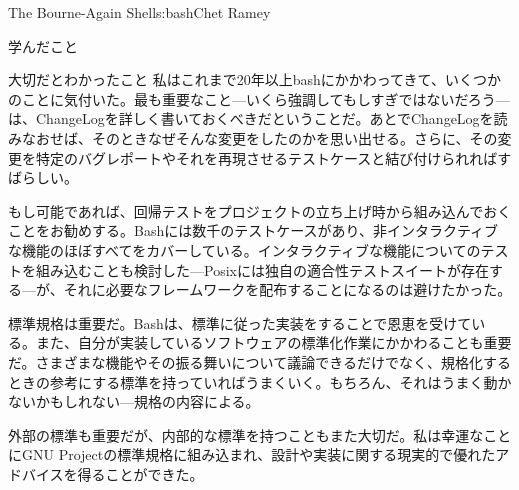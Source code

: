 \begin{aosachapter}{The Bourne-Again Shell}{s:bash}{Chet Ramey}
\begin{aosasect1}{学んだこと}
\begin{aosasect2}{大切だとわかったこと}
私はこれまで20年以上bashにかかわってきて、いくつかのことに気付いた。最も重要なこと---いくら強調してもしすぎではないだろう---は、ChangeLogを詳しく書いておくべきだということだ。あとでChangeLogを読みなおせば、そのときなぜそんな変更をしたのかを思い出せる。さらに、その変更を特定のバグレポートやそれを再現させるテストケースと結び付けられればすばらしい。

もし可能であれば、回帰テストをプロジェクトの立ち上げ時から組み込んでおくことをお勧めする。Bashには数千のテストケースがあり、非インタラクティブな機能のほぼすべてをカバーしている。インタラクティブな機能についてのテストを組み込むことも検討した---Posixには独自の適合性テストスイートが存在する---が、それに必要なフレームワークを配布することになるのは避けたかった。

標準規格は重要だ。Bashは、標準に従った実装をすることで恩恵を受けている。また、自分が実装しているソフトウェアの標準化作業にかかわることも重要だ。さまざまな機能やその振る舞いについて議論できるだけでなく、規格化するときの参考にする標準を持っていればうまくいく。もちろん、それはうまく動かないかもしれない---規格の内容による。

外部の標準も重要だが、内部的な標準を持つこともまた大切だ。私は幸運なことにGNU Projectの標準規格に組み込まれ、設計や実装に関する現実的で優れたアドバイスを得ることができた。


\end{aosasect2}
\end{aosasect1}
\end{aosachapter}
